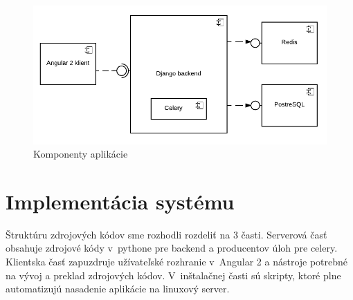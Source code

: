 \begin{figure}[htbp]
 \centering 
 \begin{minipage}{0.95\linewidth}
 	\centering
 	\includegraphics[width=\textwidth]{Images/thesis-component-diagram.pdf}	
 \end{minipage}
  \caption{Komponenty aplikácie }
  \label{fig:components}
\end{figure}

\section{Implementácia systému}
Štruktúru zdrojových kódov sme rozhodli rozdeliť na 3 časti. Serverová časť obsahuje zdrojové kódy v~pythone pre backend a producentov úloh pre celery. Klientska časť zapuzdruje užívateľské rozhranie v~Angular 2 a nástroje potrebné na vývoj a preklad zdrojových kódov. V~inštalačnej časti sú skripty, ktoré plne automatizujú nasadenie aplikácie na linuxový server.